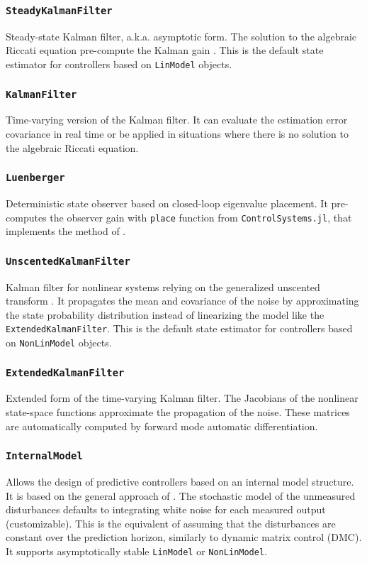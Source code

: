 \subsubsection{\textnormal{\texttt{SteadyKalmanFilter}}}
Steady-state Kalman filter, a.k.a. asymptotic form. The solution to the algebraic Riccati equation pre-compute the Kalman gain \citep{simon}. This is the default state estimator for controllers based on \texttt{LinModel} objects.

\subsubsection{\textnormal{\texttt{KalmanFilter}}}
Time-varying version of the Kalman filter. It can evaluate the estimation error covariance in real time or be applied in situations where there is no solution to the algebraic Riccati equation.

\subsubsection{\textnormal{\texttt{Luenberger}}}
Deterministic state observer based on closed-loop eigenvalue placement. It pre-computes the observer gain with \texttt{place} function from \texttt{ControlSystems.jl}, that implements the method of \citet{placePoles}.

\subsubsection{\textnormal{\texttt{UnscentedKalmanFilter}}}
Kalman filter for nonlinear systems relying on the generalized unscented transform \citep{simon}. It propagates the mean and covariance of the noise by approximating the state probability distribution instead of linearizing the model like the \texttt{ExtendedKalmanFilter}. This is the default state estimator for controllers based on \texttt{NonLinModel} objects.

\subsubsection{\textnormal{\texttt{ExtendedKalmanFilter}}}
Extended form of the time-varying Kalman filter. The Jacobians of the nonlinear state-space functions approximate the propagation of the noise. These matrices are automatically computed by forward mode automatic differentiation.

\subsubsection{\textnormal{\texttt{InternalModel}}}
Allows the design of predictive controllers based on an internal model structure. It is based on the general approach of \citet{globPC}. The stochastic model of the unmeasured disturbances defaults to integrating white noise for each measured output (customizable). This is the equivalent of assuming that the disturbances are constant over the prediction horizon, similarly to dynamic matrix control (DMC). It supports asymptotically stable \texttt{LinModel} or \texttt{NonLinModel}.

